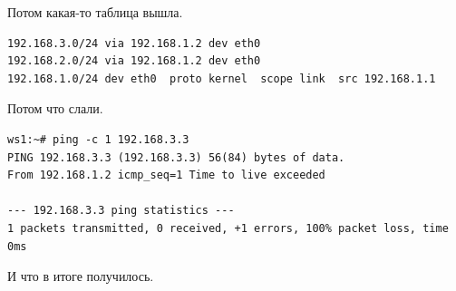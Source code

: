 \documentclass[a4paper,12pt]{article}
\begin{document}
Потом какая-то таблица вышла.

\begin{Verbatim}
192.168.3.0/24 via 192.168.1.2 dev eth0 
192.168.2.0/24 via 192.168.1.2 dev eth0 
192.168.1.0/24 dev eth0  proto kernel  scope link  src 192.168.1.1 
\end{Verbatim}

Потом что слали.

\begin{Verbatim}
ws1:~# ping -c 1 192.168.3.3
PING 192.168.3.3 (192.168.3.3) 56(84) bytes of data.
From 192.168.1.2 icmp_seq=1 Time to live exceeded

--- 192.168.3.3 ping statistics ---
1 packets transmitted, 0 received, +1 errors, 100% packet loss, time 0ms
\end{Verbatim}

И что в итоге получилось.
\end{document}
